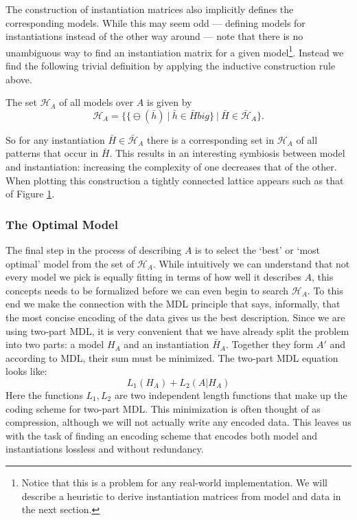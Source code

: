\documentclass{llncs}
\begin{document}
The construction of instantiation matrices also implicitly defines the corresponding models. While this may seem odd --- defining models for instantiations instead of the other way around --- note that there is no unambiguous way to find an instantiation matrix for a given model\footnote{Notice that this is a problem for any real-world implementation. We will describe a heuristic to derive instantiation matrices from model and data in the next section.}. Instead we find the following trivial definition by applying the inductive construction rule above.
\begin{definition}
The set $\mathcal{H}_A$ of all models over $A$ is given by
$$
\mathcal{H}_A=\Big\{\big\{\ominus(\bar{h}) \ | \ \bar{h} \in \bar{H} big\} \ \Big | \ \bar{H} \in \bar{\mathcal{H}}_A \Big\}.
$$ 
\end{definition}
So for any instantiation $\bar{H}\in \bar{\mathcal{H}}_A$ there is a corresponding set in $\mathcal{H}_A$ of all patterns that occur in $\bar{H}$. This results in an interesting symbiosis between model and instantiation: increasing the complexity of one decreases that of the other. When plotting this construction a tightly connected lattice appears such as that of Figure \ref{lattice}. 

\begin{figure}

\label{lattice}
\end{figure}

\subsubsection{The Optimal Model}

The final step in the process of describing $A$ is to select the `best' or `most optimal' model from the set of $\mathcal{H}_A$. While intuitively we can understand that not every model we pick is equally fitting in terms of how well it describes $A$, this concepts needs to be formalized before we can even begin to search $\mathcal{H}_A$. To this end we make the connection with the MDL principle that says, informally, that the most concise encoding of the data gives us the best description. Since we are using two-part MDL, it is very convenient that we have already split the problem into two parts:  a model $H_A$ and an instantiation $\bar{H}_A$. Together they form $A'$ and according to MDL, their sum must be minimized. The two-part MDL equation looks like:
$$
L_1(H_A) + L_2(A|H_A)
$$
Here the functions $L_1, L_2$ are two independent length functions that make up the coding scheme for two-part MDL. This minimization is often thought of as compression, although we will not actually write any encoded data. This leaves us with the task of finding an encoding scheme that encodes both model and instantiations lossless and without redundancy.
\end{document}
